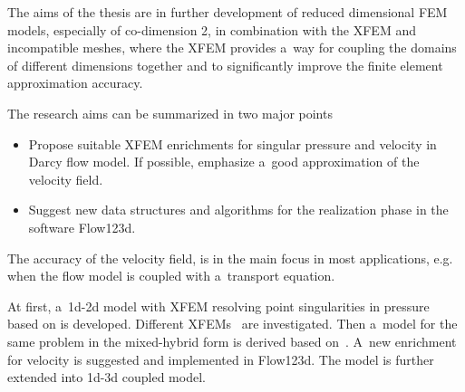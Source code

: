 The aims of the thesis are in further development of reduced dimensional FEM models,
especially of co-dimension 2, in combination with the XFEM and incompatible meshes, where the XFEM provides
a~way for coupling the domains of different dimensions together and to significantly improve the finite element approximation accuracy.

The research aims can be summarized in two major points
\begin{itemize}
    \item Propose suitable XFEM enrichments for singular pressure and velocity in Darcy flow model. 
        If possible, emphasize a~good approximation of the velocity field.
        
    \item Suggest new data structures and algorithms for the realization phase in the software Flow123d. 
\end{itemize}
The accuracy of the velocity field, is in the main focus in most applications,
e.g. when the flow model is coupled with a~transport equation.


At first, a~1d-2d model with XFEM resolving point singularities in pressure
based on \cite{gracie_modelling_2010,craig_using_2011} is developed.
Different XFEMs~\cite{fries_corrected_2008, babuska_stable_2012} are investigated.
Then a~model for the same problem in the mixed-hybrid form is derived based on~\cite{sistek_bddc_2015}.
A~new enrichment for velocity is suggested and implemented in Flow123d.
The model is further extended into 1d-3d coupled model.



